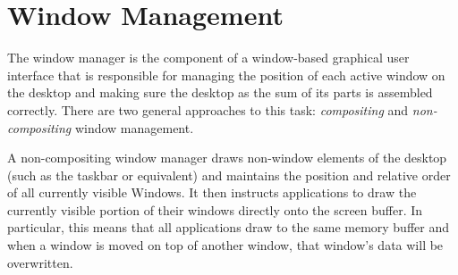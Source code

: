 \documentclass[10pt,twocolumn,a4paper]{article}
\begin{document}
	\section{Window Management}
			The window manager is the component of a window-based graphical user
			interface that is responsible for managing the position of each active
			window on the desktop and making sure the desktop as the sum of its
			parts is assembled correctly. There are two general approaches to this
			task: \emph{compositing} and \emph{non-compositing} window management.

			A non-compositing window manager draws non-window elements of the
			desktop (such as the taskbar or equivalent) and maintains the
			position and relative order of all currently visible Windows. It
			then instructs applications to draw the currently visible portion
			of their windows directly onto the screen buffer. In particular,
			this means that all applications draw to the same memory buffer and
			when a window is moved on top of another window, that window's data
			will be overwritten.
\end{document}
